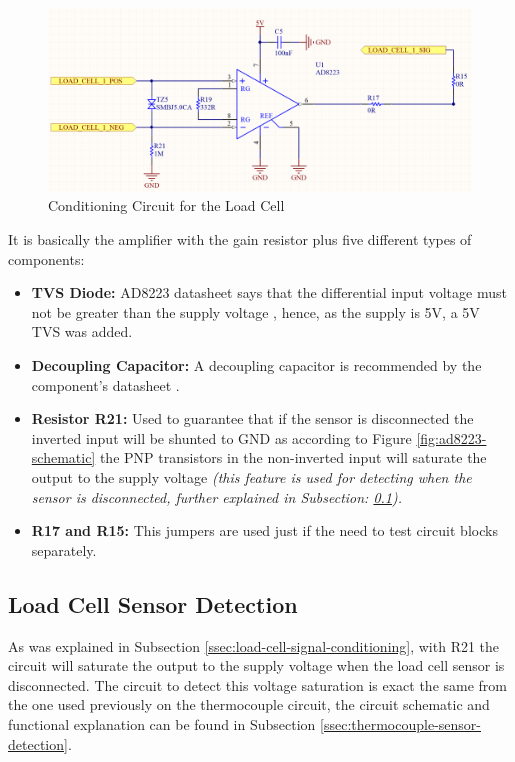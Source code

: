 		\begin{figure}[htbp]
			\centering
				\includegraphics[scale=0.35]{figuras/fig-cic-cell.png}
			\caption{Conditioning Circuit for the Load Cell \cite{conditioning-circuit-for-the-load-cell}}
			\label{fig:cic-cell}
		\end{figure}

		It is basically the amplifier with the gain resistor plus five different types of components:
		\begin{itemize}
			\item \textbf{TVS Diode:} AD8223 datasheet says that the differential input voltage must not be greater than the supply voltage \cite{ad8223-datasheet}, hence, as the supply is 5V, a 5V TVS was added.
			\item \textbf{Decoupling Capacitor:} A decoupling capacitor is recommended by the component's datasheet \cite{ad8223-datasheet}.
			\item \textbf{Resistor R21:} Used to guarantee that if the sensor is disconnected the inverted input will be shunted to GND as according to Figure \ref{fig:ad8223-schematic} the PNP transistors in the non-inverted input will saturate the output to the supply voltage \textit{(this feature is used for detecting when the sensor is disconnected, further explained in Subsection: \ref{ssec:load-cell-sensor-detection}).}
			\item \textbf{R17 and R15:} This jumpers are used just if the need to test circuit blocks separately.
		\end{itemize}

\subsection{Load Cell Sensor Detection}\label{ssec:load-cell-sensor-detection}
	As was explained in Subsection \ref{ssec:load-cell-signal-conditioning}, with R21 the circuit will saturate the output to the supply voltage when the load cell sensor is disconnected. The circuit to detect this voltage saturation is exact the same from the one used previously on the thermocouple circuit, the circuit schematic and functional explanation can be found in Subsection \ref{ssec:thermocouple-sensor-detection}.

